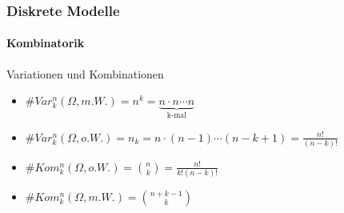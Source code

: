 \documentclass{beamer}
\begin{document}
\begin{frame}
    \frametitle{Diskrete Modelle}
\framesubtitle{Kombinatorik}

\begin{block}{Variationen und Kombinationen}
\begin{itemize}
\item $\# Var_k^n(\Omega, m.W.)  = n^k = \underbrace{n \cdot n \cdots n}_{\text{k-mal}}$
\item $\# Var_k^n(\Omega, o.W.)  = n_k = n \cdot (n-1) \cdots  (n-k+1) = \frac{n!}{(n-k)!}$  
\item $\#Kom_k^n(\Omega, o.W.) = \binom{n}{k} = \frac{n!}{k! (n-k)!}$  
\item $\#Kom_k^n(\Omega, m.W.)  = \binom{n + k -1}{k}$  
\end{itemize}
\end{block}
 \end{frame}
\end{document}
